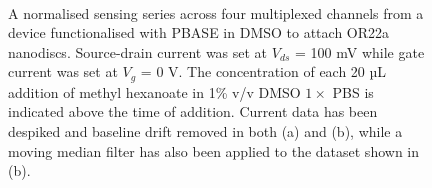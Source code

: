 \documentclass[
  a4paper,
]{scrbook}
\begin{document}
\begin{figure}
\begin{minipage}[t]{0.70\linewidth}
{{}

}

\end{minipage}%
%
\begin{minipage}[t]{0.15\linewidth}

{\centering 

~

}

\end{minipage}%

\caption{\label{fig-DMSO-sensing}A normalised sensing series across four
multiplexed channels from a device functionalised with PBASE in DMSO to
attach OR22a nanodiscs. Source-drain current was set at \(V_{ds}\) = 100
mV while gate current was set at \(V_g\) = 0 V. The concentration of
each 20 µL addition of methyl hexanoate in 1\% v/v DMSO \(1 \times\) PBS
is indicated above the time of addition. Current data has been despiked
and baseline drift removed in both (a) and (b), while a moving median
filter has also been applied to the dataset shown in (b).}

\end{figure}
\end{document}
